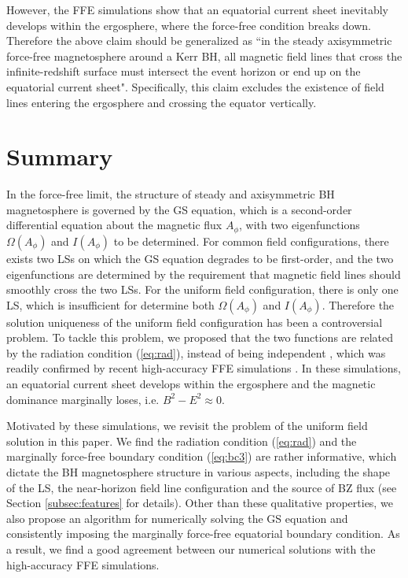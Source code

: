 \documentclass[aps,prd,reprint,nofootinbib, superscriptaddress]{revtex4-1}
\def\Ap{A_\phi}
\begin{document}
However, the FFE simulations show that an equatorial current sheet inevitably develops within the ergosphere, where
the force-free condition breaks down. Therefore the above claim should be generalized as
``in the steady axisymmetric force-free magnetosphere
around a Kerr BH, all magnetic field lines that cross the infinite-redshift surface
must intersect the event horizon or end up on the equatorial current sheet". Specifically,
this claim excludes the existence of field lines entering the ergosphere and crossing the
equator vertically.


\section{Summary}
\label{sec:summary}

In the force-free limit, the structure of steady and axisymmetric BH magnetosphere is governed by
the GS equation, which is a second-order differential equation about the magnetic flux $\Ap$, with two
eigenfunctions $\Omega(\Ap)$ and $I(\Ap)$ to be determined. For common field configurations, there exists
two LSs on which the GS equation degrades to be first-order, and the two eigenfunctions are determined
by the requirement that magnetic field lines should smoothly cross the two LSs.
For the uniform field configuration, there is only one
LS, which is insufficient for determine both  $\Omega(\Ap)$ and $I(\Ap)$.
Therefore the solution uniqueness of the uniform field configuration has been a controversial problem.
To tackle this problem, we  proposed that the two functions are related by the radiation condition (\ref{eq:rad}),
instead of being independent \cite{Pan2017}, which was readily confirmed by recent high-accuracy
FFE simulations \cite{East2018}. In these simulations, an equatorial current sheet
develops within the ergosphere and the magnetic dominance marginally loses, i.e. $B^2-E^2\approx 0$.

Motivated by these simulations, we revisit the problem of the uniform field solution in this paper.
We find the radiation condition (\ref{eq:rad}) and the marginally force-free boundary
condition (\ref{eq:bc3}) are rather informative, which dictate the BH magnetosphere structure
in various aspects, including the shape of the LS, the near-horizon field line configuration and
the source of BZ flux (see Section \ref{subsec:features} for details). Other than these qualitative properties,
we also propose an algorithm for numerically solving the GS equation and consistently imposing
the marginally force-free equatorial boundary condition. As a result, we find a good agreement
between our numerical solutions with the high-accuracy FFE simulations.
\end{document}
